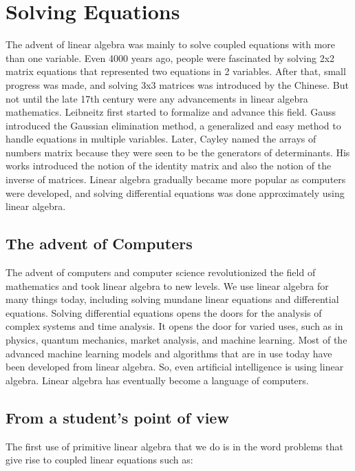 \section{Solving Equations} \label{sec:lin_eqn}

The advent of linear algebra was mainly to solve coupled equations with more than one variable. Even 4000 years ago, people were fascinated by solving 2x2 matrix equations that represented two equations in 2 variables. After that, small progress was made, and solving 3x3 matrices was introduced by the Chinese. But not until the late 17th century were any advancements in linear algebra mathematics. Leibneitz first started to formalize and advance this field. Gauss introduced the Gaussian elimination method, a generalized and easy method to handle equations in multiple variables. Later, Cayley named the arrays of numbers matrix because they were seen to be the generators of determinants. His works introduced the notion of the identity matrix and also the notion of the inverse of matrices. Linear algebra gradually became more popular as computers were developed, and solving differential equations was done approximately using linear algebra. 

\subsection{The advent of Computers}

The advent of computers and computer science revolutionized the field of mathematics and took linear algebra to new levels. We use linear algebra for many things today, including solving mundane linear equations and differential equations. Solving differential equations opens the doors for the analysis of complex systems and time analysis. It opens the door for varied uses, such as in physics, quantum mechanics, market analysis, and machine learning. Most of the advanced machine learning models and algorithms that are in use today have been developed from linear algebra. So, even artificial intelligence is using linear algebra. Linear algebra has eventually become a language of computers. 

\subsection{From a student's point of view}

The first use of primitive linear algebra that we do is in the word problems that give rise to coupled linear equations such as:

